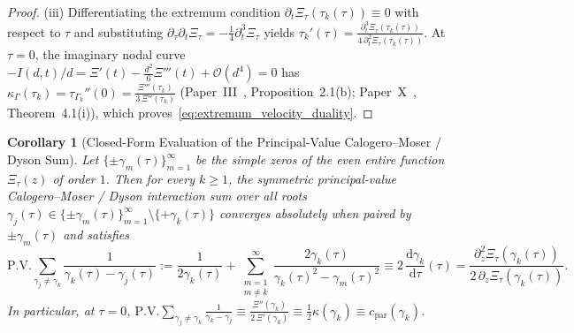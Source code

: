 \documentclass[11pt,reqno]{amsart}
\newtheorem{corollary}[theorem]{Corollary}
\theoremstyle{definition}
\theoremstyle{remark}
\numberwithin{equation}{section}
\newcommand{\dd}{\mathrm{d}}
\newcommand{\PV}{\mathrm{P.V.}}
\begin{document}
\begin{proof}
(iii) Differentiating the extremum condition $\partial_t\Xi_\tau(\tau_k(\tau)) \equiv 0$ with respect to $\tau$ and substituting $\partial_\tau\partial_t\Xi_\tau = -\frac{1}{4}\partial_t^3\Xi_\tau$ yields $\tau_k'(\tau) = \frac{\partial_t^3\Xi_\tau(\tau_k(\tau))}{4\,\partial_t^2\Xi_\tau(\tau_k(\tau))}$. At $\tau = 0$, the imaginary nodal curve $-I(d,t)/d = \Xi'(t) - \frac{d^2}{6}\Xi'''(t) + \mathcal{O}(d^4) = 0$ has $\kappa_\Gamma(\tau_k) = \tau_{\Gamma_k}''(0) = \frac{\Xi'''(\tau_k)}{3\,\Xi''(\tau_k)}$ (Paper~III~\cite{missiaen2026paper3}, Proposition~2.1(b); Paper~X~\cite{missiaen2026paper10}, Theorem~4.1(i)), which proves~\eqref{eq:extremum_velocity_duality}.
\end{proof}

\begin{corollary}[Closed-Form Evaluation of the Principal-Value Calogero--Moser / Dyson Sum]\label{cor:dyson_sum}
Let $\{\pm\gamma_m(\tau)\}_{m=1}^\infty$ be the simple zeros of the even entire function $\Xi_\tau(z)$ of order $1$. Then for every $k \ge 1$, the symmetric principal-value Calogero--Moser / Dyson interaction sum over all roots $\gamma_j(\tau) \in \{\pm\gamma_m(\tau)\}_{m=1}^\infty \setminus \{+\gamma_k(\tau)\}$ converges absolutely when paired by $\pm\gamma_m(\tau)$ and satisfies
\begin{equation}\label{eq:dyson_sum_closed}
\PV\sum_{\gamma_j \neq \gamma_k} \frac{1}{\gamma_k(\tau) - \gamma_j(\tau)} := \frac{1}{2\gamma_k(\tau)} + \sum_{\substack{m=1 \\ m \neq k}}^{\infty} \frac{2\gamma_k(\tau)}{\gamma_k(\tau)^2 - \gamma_m(\tau)^2} \equiv 2\,\frac{\dd\gamma_k}{\dd\tau}(\tau) = \frac{\partial_z^2\Xi_\tau(\gamma_k(\tau))}{2\,\partial_z\Xi_\tau(\gamma_k(\tau))}.
\end{equation}
In particular, at $\tau = 0$, $\PV\sum_{\gamma_j \neq \gamma_k} \frac{1}{\gamma_k - \gamma_j} \equiv \frac{\Xi''(\gamma_k)}{2\,\Xi'(\gamma_k)} \equiv \frac{1}{2}\kappa(\gamma_k) \equiv c_{\mathrm{par}}(\gamma_k)$.
\end{corollary}
\end{document}
